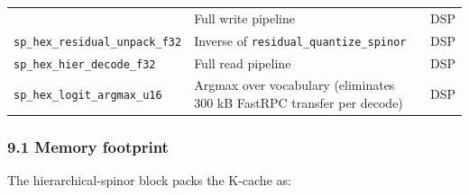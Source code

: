 \documentclass[
  11pt,
]{article}
\begin{document}
\begin{longtable}[]{@{}lll@{}}
\begin{minipage}[t]{0.39\columnwidth}
\end{minipage} & \begin{minipage}[t]{0.32\columnwidth}\raggedright
Full write pipeline\strut
\end{minipage} & \begin{minipage}[t]{0.21\columnwidth}\raggedright
DSP\strut
\end{minipage}\tabularnewline
\begin{minipage}[t]{0.39\columnwidth}\raggedright
\texttt{sp\_hex\_residual\_unpack\_f32}\strut
\end{minipage} & \begin{minipage}[t]{0.32\columnwidth}\raggedright
Inverse of \texttt{residual\_quantize\_spinor}\strut
\end{minipage} & \begin{minipage}[t]{0.21\columnwidth}\raggedright
DSP\strut
\end{minipage}\tabularnewline
\begin{minipage}[t]{0.39\columnwidth}\raggedright
\texttt{sp\_hex\_hier\_decode\_f32}\strut
\end{minipage} & \begin{minipage}[t]{0.32\columnwidth}\raggedright
Full read pipeline\strut
\end{minipage} & \begin{minipage}[t]{0.21\columnwidth}\raggedright
DSP\strut
\end{minipage}\tabularnewline
\begin{minipage}[t]{0.39\columnwidth}\raggedright
\texttt{sp\_hex\_logit\_argmax\_u16}\strut
\end{minipage} & \begin{minipage}[t]{0.32\columnwidth}\raggedright
Argmax over vocabulary (eliminates 300 kB FastRPC transfer per
decode)\strut
\end{minipage} & \begin{minipage}[t]{0.21\columnwidth}\raggedright
DSP\strut
\end{minipage}\tabularnewline
\bottomrule
\end{longtable}

\hypertarget{memory-footprint}{%
\subsubsection{9.1 Memory footprint}\label{memory-footprint}}

The hierarchical-spinor block packs the K-cache as:
\end{document}
